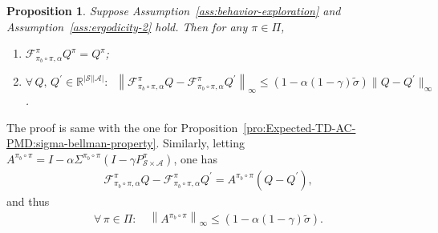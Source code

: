 \documentclass[10pt]{article}
\newcommand{\calA}{\mathcal{A}}
\newcommand{\calS}{\mathcal{S}}
\newcommand{\calF}{\mathcal{F}}
\newcommand{\ls}{\left}
\newcommand{\rs}{\right}
\theoremstyle{plain}
\newtheorem{proposition}[theorem]{Proposition}
\theoremstyle{definition}
\begin{document}
\begin{proposition}
    Suppose Assumption~\ref{ass:behavior-exploration} and Assumption~\ref{ass:ergodicity-2} hold. Then for any $\pi \in \Pi$,
    \begin{enumerate}
        \item[\textup{(a)}] $\calF^{\pi}_{\pi_b\circ\pi, \alpha} Q^\pi = Q^\pi$\textup{;}
        \item[\textup{(b)}] $\forall\, Q, \, Q^\prime \in \mathbb{R}^{|\calS||\calA|}: \;\; \ls\| \calF^{\pi}_{\pi_b\circ\pi, \alpha} Q - \calF^{\pi}_{\pi_b\circ\pi, \alpha} Q^\prime \rs\|_\infty \leq (1-\alpha(1-\gamma)\tilde\sigma) \| Q - Q^\prime \|_\infty$.
    \end{enumerate}
    \label{pro:Approximated-TD-AC-PMD:sigma-bellman-property}
\end{proposition}
The proof is same with the one for Proposition~\ref{pro:Expected-TD-AC-PMD:sigma-bellman-property}. Similarly, letting $A^{\pi_b\circ\pi} = I - \alpha \Sigma^{\pi_b\circ\pi} (I - \gamma P^{\pi}_{\scriptscriptstyle\calS\times\calA})$, one has
\begin{align*}
    \calF^{\pi}_{\pi_b\circ\pi, \alpha} Q - \calF^{\pi}_{\pi_b\circ\pi,\alpha} Q^\prime = A^{\pi_b\circ\pi} (Q - Q^\prime),
\end{align*}
and thus
\begin{align*}
    \forall\, \pi \in \Pi: \quad \ls\| A^{\pi_b\circ\pi} \rs\|_\infty \leq (1-\alpha(1-\gamma)\tilde\sigma).
\end{align*}
\end{document}
